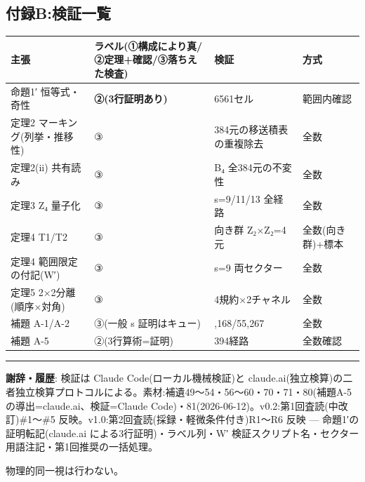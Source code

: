 \documentclass[
]{ltjsarticle}
\newcounter{none} %
\begin{document}
\subsection{付録B:検証一覧}\label{ux4ed8ux9332bux691cux8a3cux4e00ux89a7}

{\def\LTcaptype{none} %
\begin{longtable}[]{@{}
  >{\raggedright\arraybackslash}p{}
  >{\raggedright\arraybackslash}p{}
  >{\raggedright\arraybackslash}p{}
  >{\raggedright\arraybackslash}p{}@{}}
\toprule\noalign{}
\begin{minipage}[b]{\linewidth}\raggedright
主張
\end{minipage} & \begin{minipage}[b]{\linewidth}\raggedright
ラベル(①構成により真/②定理+確認/③落ちえた検査)
\end{minipage} & \begin{minipage}[b]{\linewidth}\raggedright
検証
\end{minipage} & \begin{minipage}[b]{\linewidth}\raggedright
方式
\end{minipage} \\
\midrule\noalign{}
\endhead
\bottomrule\noalign{}
\endlastfoot
命題1′ 恒等式・奇性 & \textbf{②(3行証明あり)} & 6561セル & 範囲内確認 \\
定理2 マーキング(列挙・推移性) & ③ & 384元の移送積表の重複除去 & 全数 \\
定理2(ii) 共有読み & ③ & B₄ 全384元の不変性 & 全数 \\
定理3 Z₄ 量子化 & ③ & s=9/11/13 全経路 & 全数 \\
定理4 T1/T2 & ③ & 向き群 Z₂×Z₂=4元 & 全数(向き群)+標本 \\
定理4 範囲限定の付記(W′) & ③ & s=9 両セクター & 全数 \\
定理5 2×2分離(順序×対角) & ③ & 4規約×2チャネル & 全数 \\
補題 A-1/A-2 & ③(一般 s 証明はキュー) & 103,168/55,267 & 全数 \\
補題 A-5 & ②(3行算術=証明) & 394経路 & 全数確認 \\
\end{longtable}
}

\begin{center}\rule{0.5\linewidth}{0.5pt}\end{center}

\textbf{謝辞・履歴}: 検証は Claude Code(ローカル機械検証)と
claude.ai(独立検算)の二者独立検算プロトコルによる。素材:補遺49〜54・56〜60・70・71・80(補題A-5
の導出=claude.ai、検証=Claude
Code)・81(2026-06-12)。v0.2:第1回査読(中改訂)\#1〜\#5
反映。v1.0:第2回査読(採録・軽微条件付き)R1〜R6 反映 ---
命題1′の証明転記(claude.ai による3行証明)・ラベル列・W′
検証スクリプト名・セクター用語注記・第1回推奨の一括処理。

物理的同一視は行わない。
\end{document}
